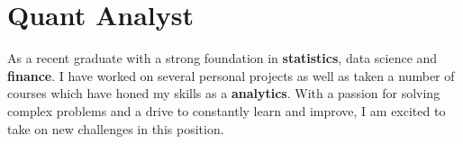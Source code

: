 
\section{Quant Analyst}
\small{
    As a recent graduate with a strong foundation in \textbf{statistics}, data science and \textbf{finance}. I have worked on several personal projects as well as taken a number of courses which have honed my skills as a \textbf{analytics}. With a passion for solving complex problems and a drive to constantly learn and improve, I am excited to take on new challenges in this position.
}